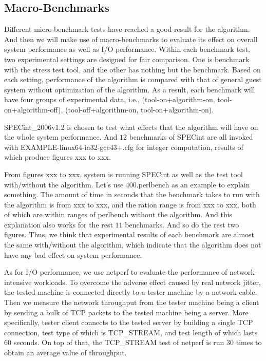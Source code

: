 \documentclass[letterpaper,twocolumn,10pt]{article}
\begin{document}
\subsection{Macro-Benchmarks}

Different micro-benchmark tests have reached a good result for the algorithm. And then we will make use of macro-benchmarks to evaluate its effect on overall system performance as well as I/O performance. Within each benchmark test, two experimental settings are designed for fair comparison. One is benchmark with the stress test tool, and the other has nothing but the benchmark. Based on each setting, performance of the algorithm is compared with that of general guest system without optimization of the algorithm. As a result, each benchmark will have four groups of experimental data, i.e., (tool-on+algorithm-on, tool-on+algorithm-off), (tool-off+algorithm-on, tool-on+algorithm-on).

SPECint\_2006v1.2 is chosen to test what effects that the algorithm will have on the whole system performance. And $12$ benchmarks of SPECint are all invoked with EXAMPLE-linux64-ia32-gcc43+.cfg for integer computation, results of which produce figures xxx to xxx.

From figures xxx to xxx, system is running SPECint as well as the test tool with/without the algorithm. Let’s use 400.perlbench as an example to explain something. The amount of time in seconds that the benchmark takes to run with the algorithm is from xxx to xxx, and the ration range is from xxx to xxx, both of which are within ranges of perlbench without the algorithm. And this explanation also works for the rest $11$ benchmarks. And so do the rest two figures. Thus, we think that experimental results of each benchmark are almost the same with/without the algorithm, which indicate that the algorithm does not have any bad effect on system performance.

As for I/O performance, we use netperf to evaluate the performance of network-intensive workloads. To overcome the adverse effect caused by real network jitter, the tested machine is connected directly to a tester machine by a network cable. Then we measure the network throughput from the tester machine being a client by sending a bulk of TCP packets to the tested machine being a server. More specifically, tester client connects to the tested server by building a single TCP connection, test type of which is TCP\_STREAM, and test length of which lasts $60$ seconds. On top of that, the TCP\_STREAM test of netperf is run $30$ times to obtain an average value of throughput.
\end{document}
